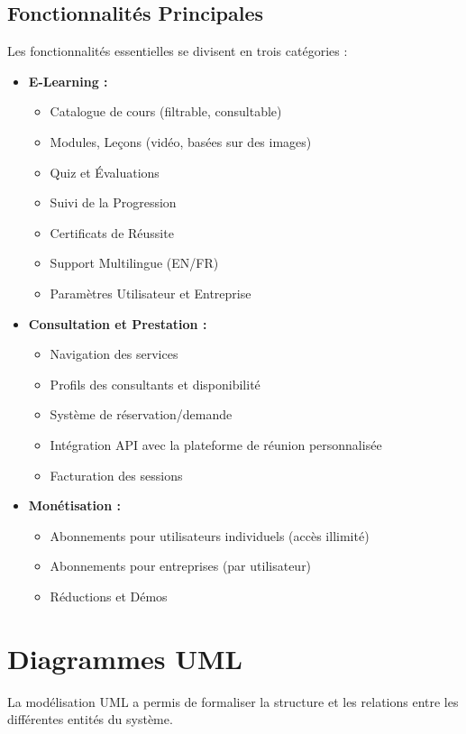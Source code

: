 \subsection{Fonctionnalités Principales}
Les fonctionnalités essentielles se divisent en trois catégories :
\begin{itemize}
    \item \textbf{E-Learning :}
    \begin{itemize}
        \item Catalogue de cours (filtrable, consultable)
        \item Modules, Leçons (vidéo, basées sur des images)
        \item Quiz et Évaluations
        \item Suivi de la Progression
        \item Certificats de Réussite
        \item Support Multilingue (EN/FR)
        \item Paramètres Utilisateur et Entreprise
    \end{itemize}
    \item \textbf{Consultation et Prestation :}
    \begin{itemize}
        \item Navigation des services
        \item Profils des consultants et disponibilité
        \item Système de réservation/demande
        \item Intégration API avec la plateforme de réunion personnalisée
        \item Facturation des sessions
    \end{itemize}
    \item \textbf{Monétisation :}
    \begin{itemize}
        \item Abonnements pour utilisateurs individuels (accès illimité)
        \item Abonnements pour entreprises (par utilisateur)
        \item Réductions et Démos
    \end{itemize}
\end{itemize}

\section{Diagrammes UML}
La modélisation UML a permis de formaliser la structure et les relations entre les différentes entités du système.

